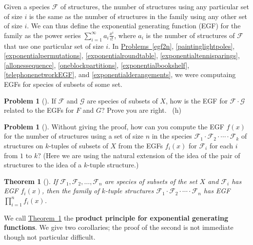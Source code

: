 \documentclass[10pt,]{book}
\newcommand{\terminology}[1]{\textbf{#1}}
\theoremstyle{plain}
\newtheorem{theorem}{Theorem}[section]
\theoremstyle{definition}
\newtheorem{activity}[project]{Problem}
\theoremstyle{definition}
\numberwithin{equation}{chapter}
\newcommand{\F}{\mathcal{F}}
\begin{document}
Given a species \(\F\) of structures, the number of structures using any particular set of size \(i\) is the same as the number of structures in the family using any other set of size \(i\).  We can thus define the exponential generating function (EGF) for the family as the power series \(\sum_{i=1}^\infty a_i \frac{x^i}{i!}\), where \(a_i\) is the number of structures of \(\F\) that use one particular set of size \(i\).  In \hyperref[egf2n]{Problems~\ref{egf2n}}, \hyperref[paintinglightpoles]{\ref{paintinglightpoles}}, \hyperref[exponentialpermutations]{\ref{exponentialpermutations}}, \hyperref[exponentialroundtable]{\ref{exponentialroundtable}}, \hyperref[exponentialtennisparings]{\ref{exponentialtennisparings}}, \hyperref[allonessequence]{\ref{allonessequence}}, \hyperref[oneblockpartitions]{\ref{oneblockpartitions}}, \hyperref[exponentialbookshelf]{\ref{exponentialbookshelf}}, \hyperref[telephonenetworkEGF]{\ref{telephonenetworkEGF}}, and \hyperref[exponentialderangements]{\ref{exponentialderangements}}, we were computaing EGFs for species of subsets of some set.%
\begin{activity}[]\marginsymbol[-1em]{} \label{activity-397}
\hypertarget{p-2126}{}%
If \(\F\) and \(\mathcal{G}\) are species of subsets of \(X\), how is the EGF for \(\F\cdot \mathcal{G}\) related to the EGFs for \(F\) and \(G\)?  Prove you are right.%
~{\tiny (h)}\end{activity}
\begin{activity}[]\marginsymbol[-1em]{} \label{genspeciesproduct}
\hypertarget{p-2129}{}%
Without giving the proof, how can you compute the EGF \(f(x)\) for the number of structures using a set of size \(n\) in the species \(\F_1\cdot\F_2\cdot \cdots\cdot \F_k\) of structures on \(k\)-tuples of subsets of \(X\) from the EGFs \(f_i(x)\) for \(\F_i\) for each \(i\) from \(1\) to \(k\)?  (Here we are using the natural extension of the idea of the pair of structures to the idea of a \(k\)-tuple structure.)%
\end{activity}
\begin{theorem}[{}]\label{genprodprincipleEGF}
\hypertarget{p-2131}{}%
If \(\F_1, \F_2, \ldots, \F_n\) are species of subsets of the set \(X\) and \(\F_i\) has EGF \(f_i(x)\), then the family of \(k\)-tuple structures \(\F_1\cdot \F_2\cdot \cdots\cdot \F_n\) has EGF \(\prod_{i=1}^n f_i(x)\).%
\end{theorem}
\hypertarget{p-2132}{}%
We call \hyperref[genprodprincipleEGF]{Theorem~\ref{genprodprincipleEGF}} the \terminology{product principle for exponential generating functions}. We give two corollaries; the proof of the second is not immediate though not particular difficult.%
\end{document}
